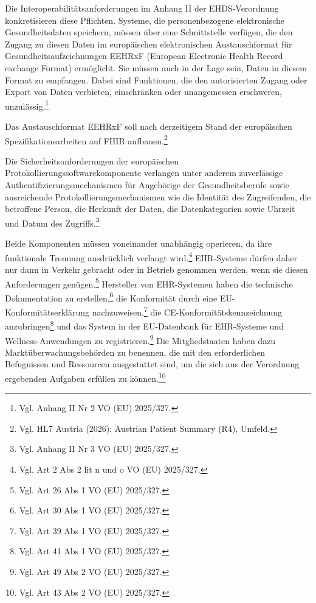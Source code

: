 Die Interoperabilitätsanforderungen im Anhang II der EHDS-Verordnung konkretisieren diese Pflichten. Systeme, die personenbezogene elektronische Gesundheitsdaten speichern, müssen über eine Schnittstelle verfügen, die den Zugang zu diesen Daten im europäischen elektronischen Austauschformat für Gesundheitsaufzeichnungen EEHRxF (European Electronic Health Record exchange Format) ermöglicht. Sie müssen auch in der Lage sein, Daten in diesem Format zu empfangen. Dabei sind Funktionen, die den autorisierten Zugang oder Export von Daten verbieten, einschränken oder unangemessen erschweren, unzulässig.\footnote{Vgl. Anhang II Nr 2 VO (EU) 2025/327.}

Das Austauschformat EEHRxF soll nach derzeitigem Stand der europäischen
Spezifikationsarbeiten auf FHIR aufbauen.\footnote{Vgl. HL7 Austria (2026):
Austrian Patient Summary (R4), Umfeld.}

Die Sicherheitsanforderungen der europäischen Protokollierungssoftwarekomponente verlangen unter anderem zuverlässige Authentifizierungsmechanismen für Angehörige der Gesundheitsberufe sowie ausreichende Protokollierungsmechanismen wie die Identität des Zugreifenden, die betroffene Person, die Herkunft der Daten, die Datenkategorien sowie Uhrzeit und Datum des Zugriffs.\footnote{Vgl. Anhang II Nr 3 VO (EU) 2025/327.}

Beide Komponenten müssen voneinander unabhängig operieren, da ihre funktionale Trennung ausdrücklich verlangt wird.\footnote{Vgl. Art 2 Abs 2 lit n und o VO (EU) 2025/327.}  EHR-Systeme dürfen daher nur dann in Verkehr gebracht oder in Betrieb genommen werden, wenn sie diesen Anforderungen genügen.\footnote{Vgl. Art 26 Abs 1 VO (EU) 2025/327.} Hersteller von EHR-Systemen haben die technische Dokumentation zu erstellen,\footnote{Vgl. Art 30 Abs 1 VO (EU) 2025/327.} die Konformität durch eine EU-Konformitätserklärung nachzuweisen,\footnote{Vgl. Art 39 Abs 1 VO (EU) 2025/327.} die CE-Konformitätskennzeichnung anzubringen\footnote{Vgl. Art 41 Abs 1 VO (EU) 2025/327.} und das System in der EU-Datenbank für EHR-Systeme und Wellness-Anwendungen zu registrieren.\footnote{Vgl. Art 49 Abs 2 VO (EU) 2025/327.} Die Mitgliedstaaten haben dazu Marktüberwachungsbehörden zu benennen, die mit den erforderlichen Befugnissen und Ressourcen ausgestattet sind, um die sich aus der Verordnung ergebenden Aufgaben erfüllen zu können.\footnote{Vgl. Art 43 Abs 2 VO (EU) 2025/327.}

